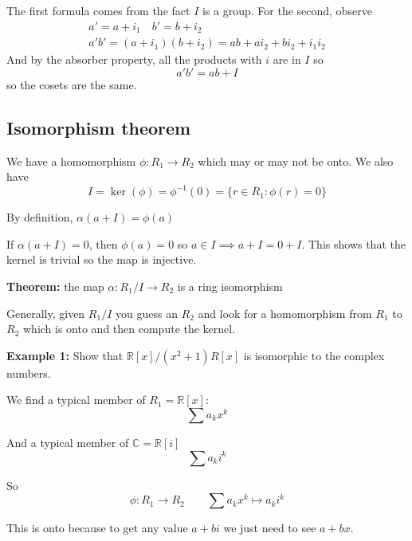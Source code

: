 \documentclass[12pt]{article}
\newcommand{\R}{\mathbb{R}}
\begin{document}
The first formula comes from the fact $I$ is a group. For the second, observe 
\begin{gather}
    a' = a + i_1 \quad b' = b + i_2\\ 
    a'b' = (a + i_1)(b + i_2) = ab + ai_2 + bi_2 + i_1i_2
\end{gather}
And by the absorber property, all the products with $i$ are in $I$ so 
\[a'b' = ab + I\]
so the cosets are the same. 

\subsection*{Isomorphism theorem}
We have a homomorphism $\phi: R_1 \to R_2$ which may or may not be onto. We also have 
\[I = \ker(\phi) = \phi^{-1}(0) = \{r \in R_1: \phi(r) = 0\}\]

\begin{center}
\end{center}

By definition, $\alpha(a + I) = \phi(a)$

If $\alpha(a + I) = 0$, then $\phi(a) = 0$ so $a \in I \implies a + I = 0 + I$. This shows that the kernel is trivial so the map is injective. 

\textbf{Theorem:} the map $\alpha: R_1/I \to R_2$ is a ring isomorphism

Generally, given $R_1/I$ you guess an $R_2$ and look for a homomorphism from $R_1$ to $R_2$ which is onto and then compute the kernel. 

\textbf{Example 1:} Show that $\R[x]/(x^2 + 1)R[x]$ is isomorphic to the complex numbers. 

We find a typical member of $R_1 = \R[x]$:
\[\sum a_k x^k\]

And a typical member of $\mathbb C = \R[i]$
\[\sum a_k i^k\]

So 
\[\phi: R_1 \to R_2 \qquad \sum a_k x^k \mapsto a_k i^k\]

This is onto because to get any value $a + bi$ we just need to see $a + bx$. 
\end{document}
